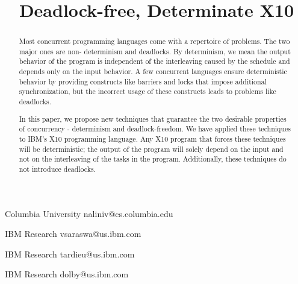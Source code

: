 \documentclass[preprint]{sigplanconf}
\begin{document}
\copyrightdata{[to be supplied]} 



\title{Deadlock-free, Determinate X10}

           {Columbia University}
           {naliniv@cs.columbia.edu}

           {IBM Research}
           {vsaraswa@us.ibm.com}


           {IBM Research}
           {tardieu@us.ibm.com}


           {IBM Research}
           {dolby@us.ibm.com}


\maketitle


\newcommand{\figref}[1]{Figure~\ref{fig:#1}}
\newcommand{\secref}[1]{Section~\ref{sec:#1}}
\newcommand{\tabref}[1]{Table~\ref{tab:#1}}
\newcommand{\lemref}[1]{Lemma~\ref{lem:#1}}
\newcommand{\algref}[1]{Algorithm~\ref{alg:#1}}
\newcommand{\lineref}[1]{line~\ref{line:#1}}





\begin{abstract}
Most concurrent programming languages come with a repertoire of problems.
The two major ones are non- 
determinism and deadlocks. By determinism, we mean the output behavior of the program is 
independent of the interleaving caused by the schedule and depends only on the 
input behavior. A few concurrent languages ensure deterministic behavior by providing 
constructs like barriers and locks that impose additional synchronization, 
but the incorrect usage of these constructs 
leads to problems like deadlocks. 

In this paper, we propose new techniques that guarantee
the two desirable properties of concurrency - determinism and deadlock-freedom.
We have applied these techniques to IBM's X10 programming language.
Any X10 program that forces these techniques will be deterministic; the output of the program
will solely depend on the input and not on the interleaving of the tasks in the program.
Additionally, these techniques do not introduce deadlocks.

\end{abstract}
\end{document}
